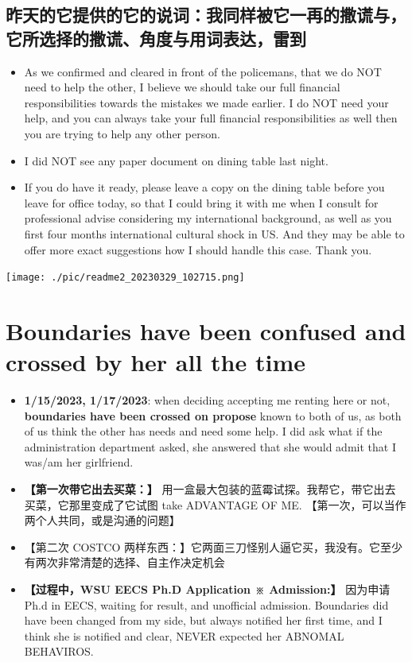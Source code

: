 \documentclass[9pt, b5paper]{article}
\begin{document}
\subsection{昨天的它提供的它的说词：我同样被它一再的撒谎与，它所选择的撒谎、角度与用词表达，雷到}
\label{sec-5-3}
\begin{itemize}
\item As we confirmed and cleared in front of the policemans, that we do NOT need to help the other, I believe we should take our full financial responsibilities towards the mistakes we made earlier. I do NOT need your help, and you can always take your full financial responsibilities as well then you are trying to help any other person.
\item I did NOT see any paper document on dining table last night.
\item If you do have it ready, please leave a copy on the dining table before you leave for office today, so that I could bring it with me when I consult for professional advise considering my international background, as well as you first four months international cultural shock in US. And they may be able to offer more exact suggestions how I should handle this case. Thank you.
\end{itemize}

\texttt{[image: ./pic/readme2\_20230329\_102715.png]}
\section{Boundaries have been confused and crossed by her all the time}
\label{sec-6}
\begin{itemize}
\item \textbf{1/15/2023, 1/17/2023}: when deciding accepting me renting here or not, \textbf{boundaries have been crossed on propose} known to both of us, as both of us think the other has needs and need some help. I did ask what if the administration department asked, she answered that she would admit that I was/am her girlfriend.
\item \textbf{【第一次带它出去买菜：】} 用一盒最大包装的蓝霉试探。我帮它，带它出去买菜，它那里变成了它试图 take ADVANTAGE OF ME. 【第一次，可以当作两个人共同，或是沟通的问题】
\item 【第二次 COSTCO 两样东西：】它两面三刀怪别人逼它买，我没有。它至少有两次非常清楚的选择、自主作决定机会
\item \textbf{【过程中，WSU EECS Ph.D Application ※ Admission:】} 因为申请Ph.d in EECS, waiting for result, and unofficial admission. Boundaries did have been changed from my side, but always notified her first time, and I think she is notified and clear, NEVER expected her ABNOMAL BEHAVIROS.
\end{itemize}
\end{document}
